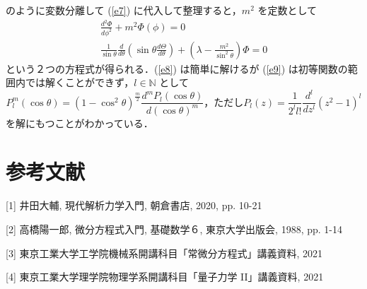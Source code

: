\documentclass[dvipdfmx, a4paper]{jsarticle}
\newcommand{\N}{\mathbb{N}}
\begin{document}
のように変数分離して (\ref{e7}) に代入して整理すると，$m^2$ を定数として
\begin{eqnarray}
    \label{e8}
    \frac{d^2\Phi}{d\phi^2}+m^2\Phi(\phi)=0\\
    \label{e9}
    \frac{1}{\sin\theta}\frac{d}{d\theta}\left(\sin\theta\frac{d\Theta}{d\theta}\right)+\left(\lambda-\frac{m^2}{\sin^2\theta}\right)\Phi=0
\end{eqnarray}
という２つの方程式が得られる．(\ref{e8}) は簡単に解けるが (\ref{e9}) は初等関数の範囲内では解くことができず，$l\in\N$ として
\begin{equation}
    P_l^m(\cos\theta)=(1-\cos^2\theta)^{\frac{m}{2}}\frac{d^mP_l(\cos\theta)}{d(\cos\theta)^m}，ただし　P_l(z)=\frac{1}{2^l l!}\frac{d^l}{dz^l}(z^2-1)^l
\end{equation}
を解にもつことがわかっている．

\section*{参考文献}

[1] 井田大輔, 現代解析力学入門, 朝倉書店, 2020, pp. 10-21

[2] 高橋陽一郎, 微分方程式入門, 基礎数学６, 東京大学出版会, 1988, pp. 1-14

[3] 東京工業大学工学院機械系開講科目「常微分方程式」講義資料, 2021

[4] 東京工業大学理学院物理学系開講科目「量子力学 II」講義資料, 2021
\end{document}
